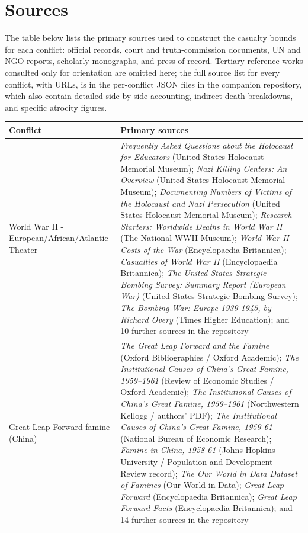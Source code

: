 \documentclass[11pt]{article}
\begin{document}
\section{Sources}
The table below lists the primary sources used to construct the casualty bounds for each conflict: official records, court and truth-commission documents, UN and NGO reports, scholarly monographs, and press of record. Tertiary reference works consulted only for orientation are omitted here; the full source list for every conflict, with URLs, is in the per-conflict JSON files in the companion repository, which also contain detailed side-by-side accounting, indirect-death breakdowns, and specific atrocity figures.
\begin{scriptsize}
\begin{longtable}{p{3.5cm} p{12.5cm}}
\toprule
Conflict & Primary sources \\
\midrule
\endhead
World War II - European/African/Atlantic Theater & \emph{Frequently Asked Questions about the Holocaust for Educators} (United States Holocaust Memorial Museum); \emph{Nazi Killing Centers: An Overview} (United States Holocaust Memorial Museum); \emph{Documenting Numbers of Victims of the Holocaust and Nazi Persecution} (United States Holocaust Memorial Museum); \emph{Research Starters: Worldwide Deaths in World War II} (The National WWII Museum); \emph{World War II - Costs of the War} (Encyclopaedia Britannica); \emph{Casualties of World War II} (Encyclopaedia Britannica); \emph{The United States Strategic Bombing Survey: Summary Report (European War)} (United States Strategic Bombing Survey); \emph{The Bombing War: Europe 1939-1945, by Richard Overy} (Times Higher Education); and 10 further sources in the repository \\
\addlinespace
Great Leap Forward famine (China) & \emph{The Great Leap Forward and the Famine} (Oxford Bibliographies / Oxford Academic); \emph{The Institutional Causes of China's Great Famine, 1959–1961} (Review of Economic Studies / Oxford Academic); \emph{The Institutional Causes of China's Great Famine, 1959–1961} (Northwestern Kellogg / authors' PDF); \emph{The Institutional Causes of China's Great Famine, 1959-61} (National Bureau of Economic Research); \emph{Famine in China, 1958-61} (Johns Hopkins University / Population and Development Review record); \emph{The Our World in Data Dataset of Famines} (Our World in Data); \emph{Great Leap Forward} (Encyclopaedia Britannica); \emph{Great Leap Forward Facts} (Encyclopaedia Britannica); and 14 further sources in the repository \\

\end{longtable}
\end{scriptsize}
\end{document}
